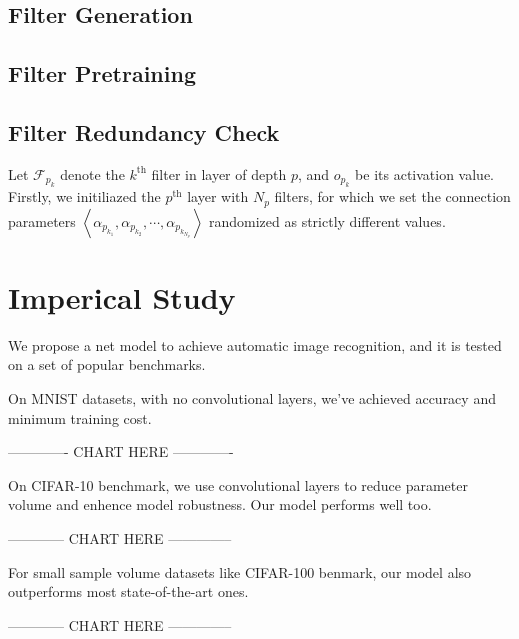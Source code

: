 \documentclass[conference]{IEEEtran}
\begin{document}
\subsection{Filter Generation}




\subsection{Filter Pretraining}



\subsection{Filter Redundancy Check}


Let $\mathcal{F}_{p_k}$ denote the $k^{\text{th}}$ filter in layer of
depth $p$, and $o_{p_k}$ be its activation value.
Firstly, we initiliazed the $p^{\text{th}}$ layer with $N_p$ filters,
for which we set the connection parameters
$\left<\alpha_{p_{k_1}},\alpha_{p_{k_2}},\cdots,\alpha_{p_{k_{N_p}}}\right>$
randomized as strictly different values.




\section{Imperical Study}
We propose a net model to achieve automatic image recognition, and it is tested
on a set of popular benchmarks.

On MNIST datasets, with no convolutional layers, we've achieved accuracy and
minimum training cost.

------------- CHART HERE -------------

On CIFAR-10 benchmark, we use convolutional layers to reduce parameter volume
and enhence model robustness. Our model performs well too.


------------ CHART HERE --------------


For small sample volume datasets like CIFAR-100 benmark, our model also outperforms
most state-of-the-art ones.


------------ CHART HERE --------------
\end{document}
